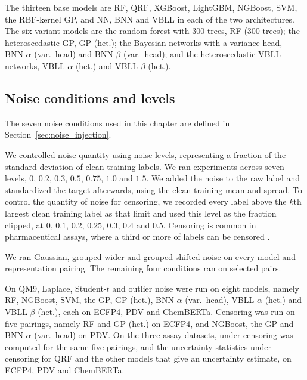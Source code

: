The thirteen base models are RF, QRF, XGBoost, LightGBM, NGBoost, SVM, the RBF-kernel GP, and NN, BNN and VBLL in each of the two architectures. The six variant models are the random forest with 300 trees, RF (300 trees); the heteroscedastic GP, GP (het.); the Bayesian networks with a variance head, BNN-$\alpha$ (var.\ head) and BNN-$\beta$ (var.\ head); and the heteroscedastic VBLL networks, VBLL-$\alpha$ (het.) and VBLL-$\beta$ (het.).

\subsection{Noise conditions and levels}
The seven noise conditions used in this chapter are defined in Section~\ref{sec:noise_injection}.

We controlled noise quantity using noise levels, representing a fraction of the standard deviation of clean training labels. We ran experiments across seven levels, $0$, $0.2$, $0.3$, $0.5$, $0.75$, $1.0$ and $1.5$. We added the noise to the raw label and standardized the target afterwards, using the clean training mean and spread. To control the quantity of noise for censoring, we recorded every label above the $k$th largest clean training label as that limit and used this level as the fraction clipped, at $0$, $0.1$, $0.2$, $0.25$, $0.3$, $0.4$ and $0.5$. Censoring is common in pharmaceutical assays, where a third or more of labels can be censored \citep{Svensson2025}.

We ran Gaussian, grouped-wider and grouped-shifted noise on every model and representation pairing. The
remaining four conditions ran on selected pairs.

On QM9, Laplace, Student-$t$ and outlier noise were run on eight models, namely RF, NGBoost, SVM, the GP, GP (het.), BNN-$\alpha$ (var.\ head), VBLL-$\alpha$ (het.) and VBLL-$\beta$ (het.), each on ECFP4, PDV and ChemBERTa. Censoring was run on five pairings, namely RF and GP (het.) on ECFP4, and NGBoost, the GP and BNN-$\alpha$ (var.\ head) on PDV. On the three assay datasets, \aucnorm{} under censoring was computed for the same five pairings, and the uncertainty statistics under censoring for QRF and the other models that give an uncertainty estimate, on ECFP4, PDV and ChemBERTa.


